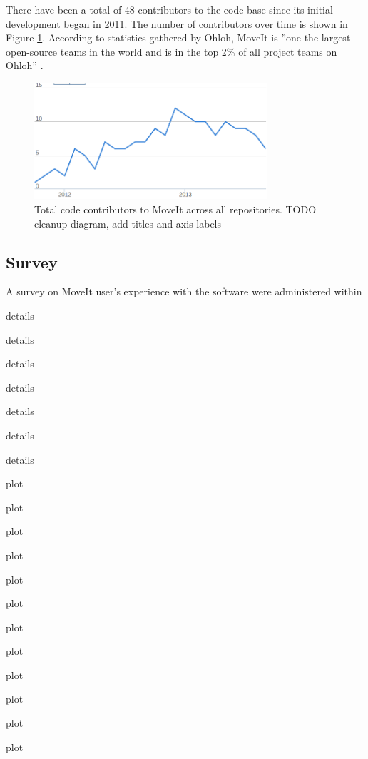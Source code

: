 \documentclass[10pt,journal,compsoc]{joser1}
\begin{document}
{There have been a total of 48 contributors to the code base since its initial development began in 2011. The number of contributors over time is shown in Figure \ref{fig:contributors}. According to statistics gathered by Ohloh, MoveIt is ''one the largest open-source teams in the world and is in the top 2\% of all project teams on Ohloh'' \cite{ohloh}.

\begin{figure}[!t]
\centering
\includegraphics[width=3.4in]{images/contributors}
\caption{Total code contributors to MoveIt across all repositories. TODO cleanup diagram, add titles and axis labels}
\label{fig:contributors}
\end{figure}


\subsection{Survey}
\label{sec::survey}

A survey on MoveIt user's experience with the software were administered within

details

details

details

details

details

details

details

plot 

plot 

plot 

plot 

plot 

plot 

plot 

plot 

plot 

plot 

plot 

plot 

}
\end{document}
